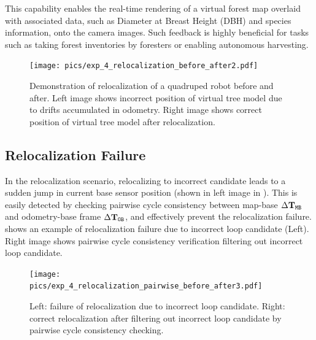 This capability enables the real-time rendering of a virtual forest map overlaid with associated data, such as Diameter at Breast Height (DBH) and species information, onto the camera images. Such feedback is highly beneficial for tasks such as taking forest inventories by foresters or enabling autonomous harvesting.
\begin{figure}[htbp]
  \centering
  \texttt{[image: pics/exp\_4\_relocalization\_before\_after2.pdf]}
  \caption{Demonstration of relocalization of a quadruped robot before and after. Left image shows incorrect position of virtual tree model due to drifts accumulated in odometry. Right image shows correct position of virtual tree model after relocalization.}
  \label{fig:relocalization_before_after}
\end{figure}

\subsection*{Relocalization Failure}
In the relocalization scenario, relocalizing to incorrect candidate leads to a sudden jump in current base sensor position (shown in left image in ). This is easily detected by checking pairwise cycle consistency between map-base $\Delta\mathbf{T}_{\mathtt{M}\mathtt{B}}$ and odometry-base frame $\Delta\mathbf{T}_{\mathtt{O}\mathtt{B}}$, and effectively prevent the relocalization failure.  shows an example of relocalization failure due to incorrect loop candidate (Left). Right image shows pairwise cycle consistency verification filtering out incorrect loop candidate.
\begin{figure}[htbp]
  \centering
  \texttt{[image: pics/exp\_4\_relocalization\_pairwise\_before\_after3.pdf]}
  \caption{Left: failure of relocalization due to incorrect loop candidate. Right: correct relocalization after filtering out incorrect loop candidate by pairwise cycle consistency checking.}
  \label{fig:relocalization_pairwise_cycle_consistency}
\end{figure}


